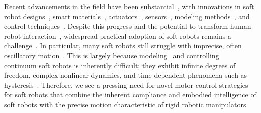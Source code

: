 Recent advancements in the field have been substantial~\citep{yasa2023overview}, with innovations in soft robot designs~\citep{laschi2012soft, hawkes2017soft, guan2023trimmed, katzschmann2018exploration, tolley2014resilient}, smart materials~\citep{terryn2017self, mazzolai2022roadmap}, actuators~\citep{shepherd2013using, vasios2020harnessing, lipton2018handedness, gravert2024low, wehner2016integrated, aubin2022towards}, sensors~\citep{larson2016highly, thuruthel2019soft, truby2020distributed}, modeling methods~\citep{renda2018discrete, boyer2020dynamics, renda2020geometric}, and control techniques~\citep{thuruthel2018model, della2020model, jitosho2023reinforcement, pustina2024input}. Despite this progress and the potential to transform human-robot interaction~\citep{jorgensen2022soft}, widespread practical adoption of soft robots remains a challenge~\citep{hawkes2021hard}. In particular, many soft robots still struggle with imprecise, often oscillatory motion~\citep{mazzolai2022roadmap, majidi2014soft, hawkes2017soft}. This is largely because modeling~\citep{armanini2023soft} and controlling~\citep{della2023model} continuum soft robots is inherently difficult; they exhibit infinite degrees of freedom, complex nonlinear dynamics, and time-dependent phenomena such as hysteresis~\citep{armanini2023soft}.
Therefore, we see a pressing need for novel motor control strategies for soft robots that combine the inherent compliance and embodied intelligence of soft robots with the precise motion characteristic of rigid robotic manipulators.

